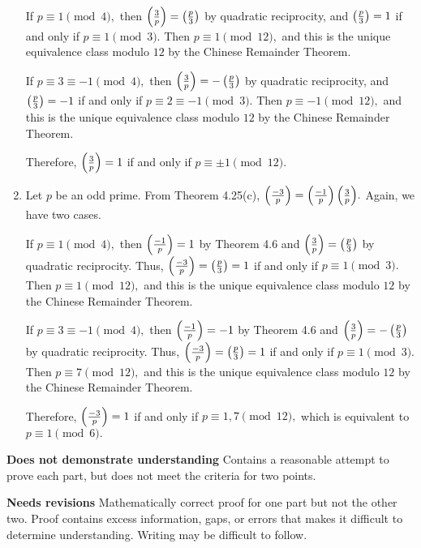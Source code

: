 \documentclass[letterpaper, 11pt]{ximera}
\begin{document}
\begin{ex}
\begin{solution}
\begin{enumerate}[label=(\alph*)]
			If $p\equiv 1\pmod{4},$ then $\left(\frac{3}{p}\right)={\left(\frac{p}{3}\right)}$ by quadratic reciprocity, and $\left(\frac{p}{3}\right)=1$ if and only if $p\equiv{1\pmod{3}}$. Then $p\equiv {1}\pmod{12},$ and this is the unique equivalence class modulo $12$ by the Chinese Remainder Theorem.
					
			If $p\equiv 3\equiv -1\pmod{4},$ then $\left(\frac{3}{p}\right)={-\left(\frac{p}{3}\right)}$ by quadratic reciprocity, and $\left(\frac{p}{3}\right)=-1$ if and only if $p\equiv{ 2\equiv-1\pmod{3}}$. Then $p\equiv {-1}\pmod{12},$ and this is the unique equivalence class modulo $12$ by the Chinese Remainder Theorem.

			Therefore, $\left(\frac{3}{p}\right)=1$ if and only if $p\equiv \pm1\pmod{12}.$ 
					
			\item Let $p$ be an odd prime.	From Theorem 4.25(c), $\left(\frac{-3}{p}\right)= {\left(\frac{-1}{p}\right)\left(\frac{3}{p}\right)}.$
			Again, we have two cases.
			
			If $p\equiv 1\pmod{4},$ then $\left(\frac{-1}{p}\right)={1}$ by Theorem 4.6 and $\left(\frac{3}{p}\right)={\left(\frac{p}{3}\right)}$ by quadratic reciprocity. Thus, $\left(\frac{-3}{p}\right)={\left(\frac{p}{3}\right)}=1$ if and only if $p\equiv {1\pmod{3}}.$ Then $p\equiv {1}\pmod{12},$ and this is the unique equivalence class modulo $12$ by the Chinese Remainder Theorem.
					
			If $p\equiv 3\equiv -1\pmod{4},$ then $\left(\frac{-1}{p}\right)={-1}$ by Theorem 4.6 and $\left(\frac{3}{p}\right)={-\left(\frac{p}{3}\right)}$ by quadratic reciprocity. Thus, $\left(\frac{-3}{p}\right)={\left(\frac{p}{3}\right)}=1$ if and only if $p\equiv {1\pmod{3}}.$ Then $p\equiv {7}\pmod{12},$ and this is the unique equivalence class modulo $12$ by the Chinese Remainder Theorem.

			Therefore, $\left(\frac{-3}{p}\right)=1$ if and only if $p\equiv {1,7}\pmod{12},$ which is equivalent to $p\equiv 1\pmod{6}.$
	   \end{enumerate}
   \end{solution}

\begin{writeRubric}
    \item \textbf{Does not demonstrate understanding}
     Contains a reasonable attempt to prove each part, but does not meet the criteria for two points.
    \item \textbf{Needs revisions} Mathematically correct proof for one part but not the other two. Proof contains excess information, gaps, or errors that makes it difficult to determine understanding. Writing may be difficult to follow. 
     

\end{writeRubric}
\end{ex}
\end{document}
